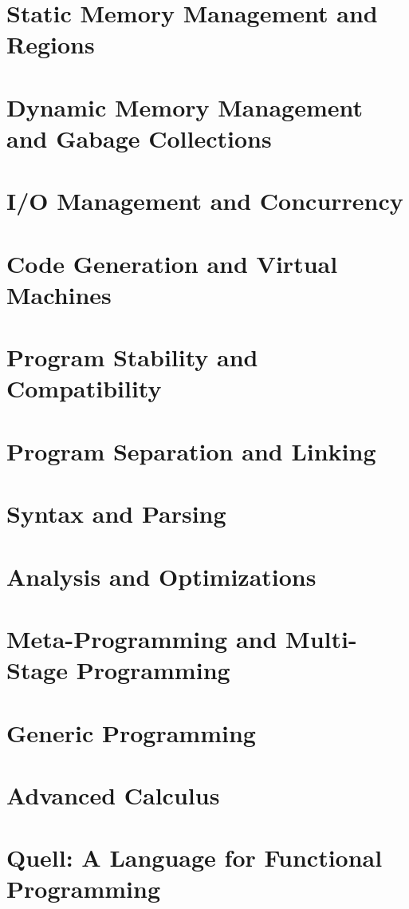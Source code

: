 \documentclass[
  luatex,
  japanese,
  unicode,
  titlepage,
  pdfusetitle
]{ltjsbook}
\begin{document}
\chapter{Static Memory Management and Regions}

\chapter{Dynamic Memory Management and Gabage Collections}




\chapter{I/O Management and Concurrency}

\chapter{Code Generation and Virtual Machines}

\chapter{Program Stability and Compatibility}

\chapter{Program Separation and Linking}

\chapter{Syntax and Parsing}






\chapter{Analysis and Optimizations}

\chapter{Meta-Programming and Multi-Stage Programming}

\chapter{Generic Programming}

\chapter{Advanced Calculus}

\chapter{Quell: A Language for Functional Programming}






\end{document}
